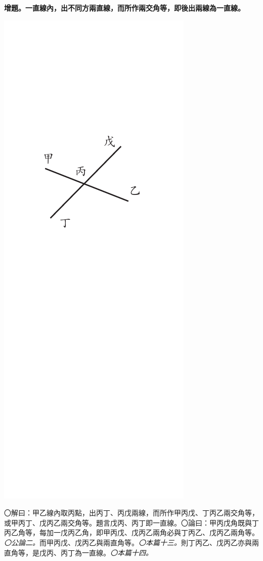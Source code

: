 \documentclass[12pt,b5paper,landscape]{article}
\newcommand{\ccom}[1]{{\footnotesize \emph{〇#1}}}
\newcommand{\bcom}[1]{〇#1}
\newcommand{\cthm}[1]{{
\vspace{8pt}

\bfseries #1}}
\begin{document}
\begin{multicols}{2}
\cthm{增題。一直線內，出不同方兩直線，而所作兩交角等，即後出兩線為一直線。}
\begin{center}
\includegraphics[angle=90]{eu60}
\end{center}
\bcom{解曰：甲乙線內取丙點，出丙丁、丙戊兩線，而所作甲丙戊、丁丙乙兩交角等，或甲丙丁、戊丙乙兩交角等。題言戊丙、丙丁即一直線。}\bcom{論曰：甲丙戊角既與丁丙乙角等，每加一戊丙乙角，即甲丙戊、戊丙乙兩角必與丁丙乙、戊丙乙兩角等。\ccom{公論二。}而甲丙戊、戊丙乙與兩直角等。\ccom{本篇十三。}則丁丙乙、戊丙乙亦與兩直角等，是戊丙、丙丁為一直線。\ccom{本篇十四。}}


\end{multicols}
\end{document}
